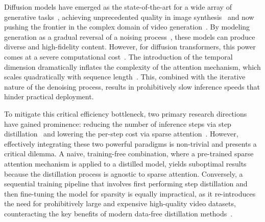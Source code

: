 \documentclass[letterpaper]{article} %
\begin{document}
Diffusion models have emerged as the state-of-the-art for a wide array of generative tasks~\cite{dhariwal2021diffusionmodelsbeatgans}, achieving unprecedented quality in image synthesis~\cite{cao2024controllablegenerationtexttoimagediffusion,esser2024scalingrectifiedflowtransformers,labs2025flux1kontextflowmatching} and now pushing the frontier in the complex domain of video generation~\cite{blattmann2023alignlatentshighresolutionvideo,xing2024surveyvideodiffusionmodels}. By modeling generation as a gradual reversal of a noising process~\cite{ho2020denoisingdiffusionprobabilisticmodels}, these models can produce diverse and high-fidelity content. However, for diffusion transformers, this power comes at a severe computational cost~\cite{shen2025efficientdiffusionmodelssurvey}. The introduction of the temporal dimension dramatically inflates the complexity of the attention mechanism, which scales quadratically with sequence length~\cite{wan2025,yang2024cogvideox,kong2025hunyuanvideosystematicframeworklarge}. This, combined with the iterative nature of the denoising process, results in prohibitively slow inference speeds that hinder practical deployment.

To mitigate this critical efficiency bottleneck, two primary research directions have gained prominence: reducing the number of inference steps via step distillation~\cite{song2023consistency,salimans2022progressivedistillationfastsampling,liu2024instaflowstephighqualitydiffusionbased,zheng2024trajectoryconsistencydistillationimproved,gu2023bootdatafreedistillationdenoising,goodfellow2014generativeadversarialnetworks,yin2024improved} and lowering the per-step cost via sparse attention~\cite{zhang2025fastvideogenerationsliding,yuan2024ditfastattnattentioncompressiondiffusion,zhang2025spargeattentionaccuratetrainingfreesparse,li2025radialattentiononlogn,xu2025xattentionblocksparseattention,dao2022flashattentionfastmemoryefficientexact}. However, effectively integrating these two powerful paradigms is non-trivial and presents a critical dilemma. A naive, training-free combination, where a pre-trained sparse attention mechanism is applied to a distilled model, yields suboptimal results because the distillation process is agnostic to sparse attention. Conversely, a sequential training pipeline that involves first performing step distillation and then fine-tuning the model for sparsity is equally impractical, as it re-introduces the need for prohibitively large and expensive high-quality video datasets, counteracting the key benefits of modern data-free distillation methods~\cite{gu2023bootdatafreedistillationdenoising,sauer2024fasthighresolutionimagesynthesis,luo2025tdm}.
\end{document}
